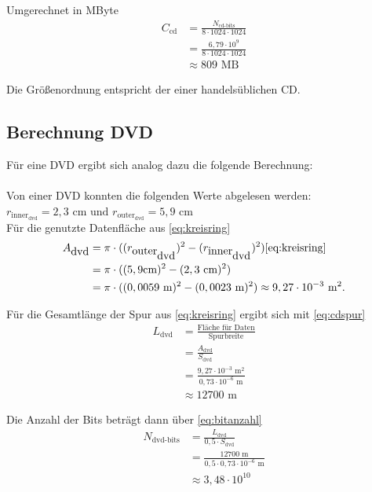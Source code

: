 \documentclass[9pt,twocolumn,twoside]{pnas-new}
\begin{document}
Umgerechnet in MByte
\begin{align*}
C_{\mbox{cd}} &= \frac{N_{\mbox{cd-bits}}}{8\cdot1024\cdot1024}\\
&= \frac{ 6,79\cdot10^9}{8\cdot1024\cdot1024}\\
&\approx 809\mbox{ MB}
\end{align*}

Die Größenordnung entspricht der einer handelsüblichen CD.

\subsection{Berechnung DVD}
Für eine DVD ergibt sich analog dazu die folgende Berechnung: \\ \\
Von einer DVD konnten die folgenden Werte abgelesen werden: \begin{math} r_{\mbox{inner}_{\mbox{dvd}}} = 2,3 \mbox{ cm und } r_{\mbox{outer}_{\mbox{dvd}}} = 5,9 \mbox{ cm} \end{math} \\

Für die genutzte Datenfläche aus \eqref{eq:kreisring}
\begin{align*}
 A_{\mbox{dvd}} &= \pi\cdot((r_{\mbox{outer}_{\mbox{dvd}}})^2-(r_{\mbox{inner}_{\mbox{dvd}}})^2)  \ref{eq:kreisring}\\	
&= \pi\cdot((5,9\mbox{cm})^2-(2,3\mbox{ cm})^2) \\
 &=  \pi\cdot((0,0059\mbox{ m})^2-(0,0023\mbox{ m})^2) \approx 9,27\cdot10^{-3}\mbox{ m}^2.
\end{align*}

Für die Gesamtlänge der Spur aus \ref{eq:kreisring} ergibt sich mit \eqref{eq:cdspur}
\begin{align*}
 L_{\mbox{dvd}} &= \frac{\mbox{Fläche für Daten}}{\mbox{Spurbreite}}\\
 &= \frac{A_{\mbox{dvd}}}{S_{\mbox{dvd}}}\\
 &= \frac{9,27\cdot10^{-3}\mbox{ m}^2}{0,73\cdot10^{-6}\mbox{ m} }\\
 &\approx 12700\mbox{ m}
\end{align*}

Die Anzahl der Bits beträgt dann über \eqref{eq:bitanzahl}
\begin{align*}
N_{\mbox{dvd-bits}} &=  \frac{L_{\mbox{dvd}}}{0,5\cdot S_{\mbox{dvd}}}\\
&= \frac{12700\mbox{ m}}{0,5\cdot 0,73\cdot10^{-6}\mbox{ m}}\\
&\approx 3,48\cdot 10^{10}
\end{align*}
\end{document}
